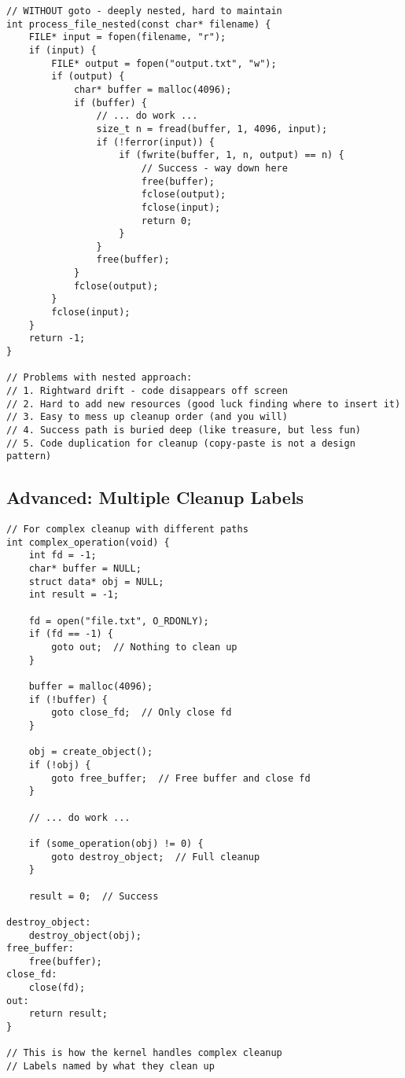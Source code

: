 \begin{lstlisting}
// WITHOUT goto - deeply nested, hard to maintain
int process_file_nested(const char* filename) {
    FILE* input = fopen(filename, "r");
    if (input) {
        FILE* output = fopen("output.txt", "w");
        if (output) {
            char* buffer = malloc(4096);
            if (buffer) {
                // ... do work ...
                size_t n = fread(buffer, 1, 4096, input);
                if (!ferror(input)) {
                    if (fwrite(buffer, 1, n, output) == n) {
                        // Success - way down here
                        free(buffer);
                        fclose(output);
                        fclose(input);
                        return 0;
                    }
                }
                free(buffer);
            }
            fclose(output);
        }
        fclose(input);
    }
    return -1;
}

// Problems with nested approach:
// 1. Rightward drift - code disappears off screen
// 2. Hard to add new resources (good luck finding where to insert it)
// 3. Easy to mess up cleanup order (and you will)
// 4. Success path is buried deep (like treasure, but less fun)
// 5. Code duplication for cleanup (copy-paste is not a design pattern)
\end{lstlisting}

\subsection{Advanced: Multiple Cleanup Labels}

\begin{lstlisting}
// For complex cleanup with different paths
int complex_operation(void) {
    int fd = -1;
    char* buffer = NULL;
    struct data* obj = NULL;
    int result = -1;

    fd = open("file.txt", O_RDONLY);
    if (fd == -1) {
        goto out;  // Nothing to clean up
    }

    buffer = malloc(4096);
    if (!buffer) {
        goto close_fd;  // Only close fd
    }

    obj = create_object();
    if (!obj) {
        goto free_buffer;  // Free buffer and close fd
    }

    // ... do work ...

    if (some_operation(obj) != 0) {
        goto destroy_object;  // Full cleanup
    }

    result = 0;  // Success

destroy_object:
    destroy_object(obj);
free_buffer:
    free(buffer);
close_fd:
    close(fd);
out:
    return result;
}

// This is how the kernel handles complex cleanup
// Labels named by what they clean up
\end{lstlisting}

